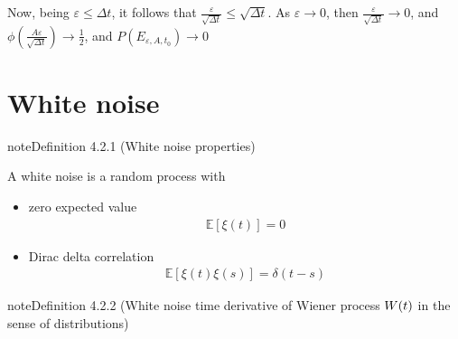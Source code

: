 \documentclass[letterpaper,10pt,english]{jupyterBook}
\begin{document}
\sphinxAtStartPar
Now, being \(\varepsilon \le \Delta t\), it follows that \(\frac{\varepsilon}{\sqrt{\Delta t}} \le \sqrt{\Delta t}\). As \(\varepsilon \rightarrow 0\), then \(\frac{\varepsilon}{\sqrt{\Delta t}} \rightarrow 0\), and \(\phi\left( \frac{A \varepsilon}{\sqrt{\Delta t}} \right) \rightarrow \frac{1}{2}\), and \(P(E_{\varepsilon,A,t_0}) \rightarrow 0\)

\sphinxstepscope


\section{White noise}
\label{\detokenize{ch/prob/white-noise:white-noise}}\label{\detokenize{ch/prob/white-noise:prob-processes-wn}}\label{\detokenize{ch/prob/white-noise::doc}}\label{ch/prob/white-noise:wn:def:properties}
\begin{sphinxadmonition}{note}{Definition 4.2.1 (White noise \sphinxhyphen{} properties)}



\sphinxAtStartPar
A white noise is a random process with
\begin{itemize}
\item {} 
\sphinxAtStartPar
zero expected value
\begin{equation*}
\begin{split}\mathbb{E}[ \xi(t) ] = 0\end{split}
\end{equation*}
\item {} 
\sphinxAtStartPar
Dirac delta correlation
\begin{equation*}
\begin{split}\mathbb{E}[ \xi(t) \xi(s) ] = \delta(t-s)\end{split}
\end{equation*}
\end{itemize}
\end{sphinxadmonition}

\sphinxAtStartPar
{} 
\label{ch/prob/white-noise:wn:def:derivative}
\begin{sphinxadmonition}{note}{Definition 4.2.2 (White noise \sphinxhyphen{} time derivative of Wiener process \protect\(W(t)\protect\) in the sense of distributions)}


\end{sphinxadmonition}

\sphinxstepscope
\end{document}
